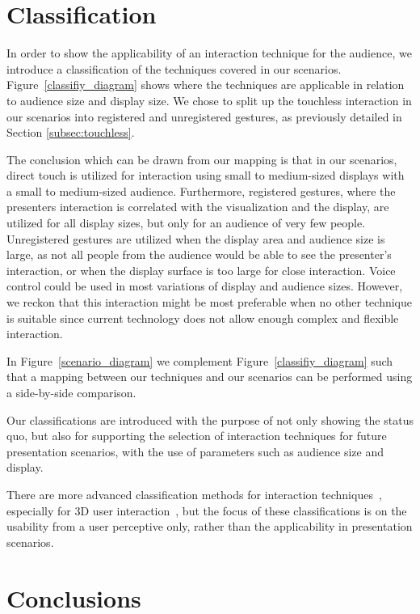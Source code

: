 \documentclass[review,journal]{vgtc}         %
\begin{document}
\section{Classification} \label{sec:classification}

In order to show the applicability of an interaction technique for the audience, we introduce a classification of the techniques covered in our scenarios.
Figure~\ref{classifiy_diagram} shows where the techniques are applicable in relation to audience size and display size. 
We chose to split up the touchless interaction in our scenarios into registered and unregistered gestures, as previously detailed in Section \ref{subsec:touchless}.

The conclusion which can be drawn from our mapping is that in our scenarios, direct touch is utilized for interaction using small to medium-sized displays with a small to medium-sized audience. 
Furthermore, registered gestures, where the presenters interaction is correlated with the visualization and the display, are utilized for all display sizes, but only for an audience of very few people.
Unregistered gestures are utilized when the display area and audience size is large, as not all people from the audience would be able to see the presenter's interaction, or when the display surface is too large for close interaction.
Voice control could be used in most variations of display and audience sizes. However, we reckon that this interaction might be most preferable when no other technique is suitable since current technology does not allow enough complex and flexible interaction.

In Figure~\ref{scenario_diagram} we complement Figure~\ref{classifiy_diagram} such that a mapping between our techniques and our scenarios can 
be performed using a side-by-side comparison.

Our classifications are introduced with the purpose of not only showing the status quo, but also for supporting the selection of interaction techniques for future presentation scenarios, with the use of parameters such as audience size and display.

There are more advanced classification methods for interaction techniques~\cite{stars:65-93:2012}, especially for 3D user interaction~\cite{978-3-319-07458-0_1, CGF:CGF194, Kettner95aclassification}, but the focus of these classifications is on the usability from a user perceptive only, rather than the applicability in presentation scenarios.

\section{Conclusions}\label{sec:conclusion}
\end{document}
